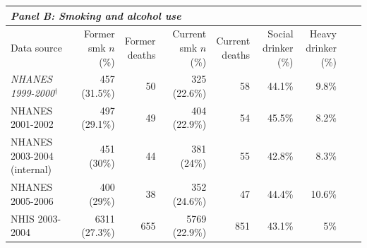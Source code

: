 \begin{table}[htbp]
\begin{tabular}{lrrrrrrrr}
\multicolumn{9}{l}{\textit{Panel B: Smoking and alcohol use}} \\
\midrule
Data source & \makecell{Former smk\\$n$ (\%)} & \makecell{Former\\deaths} &
\makecell{Current smk\\$n$ (\%)} & \makecell{Current\\deaths} &
\makecell{Social\\drinker (\%)} & \makecell{Heavy\\drinker (\%)} & & \\
\textit{NHANES 1999-2000}$^{\dagger}$ & 457 (31.5\%) & 50 & 325 (22.6\%) & 58 & 44.1\% & 9.8\% & & \\
NHANES 2001-2002 & 497 (29.1\%) & 49 & 404 (22.9\%) & 54 & 45.5\% & 8.2\% & & \\
NHANES 2003-2004 (internal) & 451 (30\%) & 44 & 381 (24\%) & 55 & 42.8\% & 8.3\% & & \\
NHANES 2005-2006 & 400 (29\%) & 38 & 352 (24.6\%) & 47 & 44.4\% & 10.6\% & & \\
NHIS 2003-2004 & 6311 (27.3\%) & 655 & 5769 (22.9\%) & 851 & 43.1\% & 5\% & & \\
\bottomrule
\end{tabular}
\end{table}
